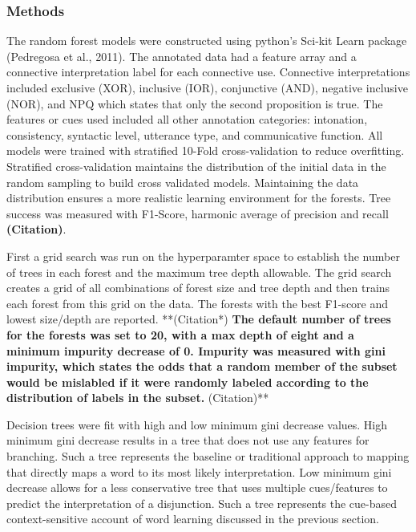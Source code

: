 \documentclass[,man,floatsintext]{apa6}
\begin{document}
\hypertarget{methods-2}{%
\subsubsection{Methods}\label{methods-2}}

The random forest models were constructed using python's Sci-kit Learn package (Pedregosa et al., 2011). The annotated data had a feature array and a connective interpretation label for each connective use. Connective interpretations included exclusive (XOR), inclusive (IOR), conjunctive (AND), negative inclusive (NOR), and NPQ which states that only the second proposition is true. The features or cues used included all other annotation categories: intonation, consistency, syntactic level, utterance type, and communicative function. All models were trained with stratified 10-Fold cross-validation to reduce overfitting. Stratified cross-validation maintains the distribution of the initial data in the random sampling to build cross validated models. Maintaining the data distribution ensures a more realistic learning environment for the forests. Tree success was measured with F1-Score, harmonic average of precision and recall \textbf{(Citation)}.

First a grid search was run on the hyperparamter space to establish the number of trees in each forest and the maximum tree depth allowable. The grid search creates a grid of all combinations of forest size and tree depth and then trains each forest from this grid on the data. The forests with the best F1-score and lowest size/depth are reported. **(Citation*)\textbf{ The default number of trees for the forests was set to 20, with a max depth of eight and a minimum impurity decrease of 0. Impurity was measured with gini impurity, which states the odds that a random member of the subset would be mislabled if it were randomly labeled according to the distribution of labels in the subset. }(Citation)**

Decision trees were fit with high and low minimum gini decrease values. High minimum gini decrease results in a tree that does not use any features for branching. Such a tree represents the baseline or traditional approach to mapping that directly maps a word to its most likely interpretation. Low minimum gini decrease allows for a less conservative tree that uses multiple cues/features to predict the interpretation of a disjunction. Such a tree represents the cue-based context-sensitive account of word learning discussed in the previous section.
\end{document}
